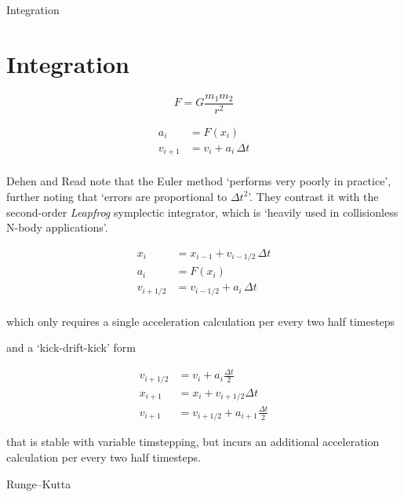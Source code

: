 \documentclass{beamer}
\begin{document}
\begin{frame}[allowframebreaks]{Integration}
\section{Integration}

\[
  F = G \frac{m_1 m_2}{r^2}
\]

\begin{align*}
a_{i}&=F(x_{i})\\
v_{i+1}&=v_{i}+a_{i}\,\Delta t\\
\end{align*}

\framebreak

Dehen and Read note that the Euler method `performs very poorly in practice', further noting that `errors are proportional to $\Delta t^2$'. They contrast it with the second-order \textit{Leapfrog} symplectic integrator, which is `heavily used in collisionless N-body applications'.

\begin{align*}
x_{i}&=x_{i-1}+v_{i-1/2}\,\Delta t\\
a_{i}&=F(x_{i})\\
v_{i+1/2}&=v_{i-1/2}+a_{i}\,\Delta t\\
\end{align*}

which only requires a single acceleration calculation per every two half timesteps

\framebreak

and a `kick-drift-kick' form

\begin{align*}
v_{i+1/2}&=v_{i}+a_{i}{\frac {\Delta t}{2}}\\
x_{i+1}&=x_{i}+v_{i+1/2}\Delta t\\
v_{i+1}&=v_{i+1/2}+a_{i+1}{\frac {\Delta t}{2}}
\end{align*}

that is stable with variable timstepping, but incurs an additional acceleration calculation per every two half timesteps.

\framebreak

Runge–Kutta


\end{frame}
\end{document}
